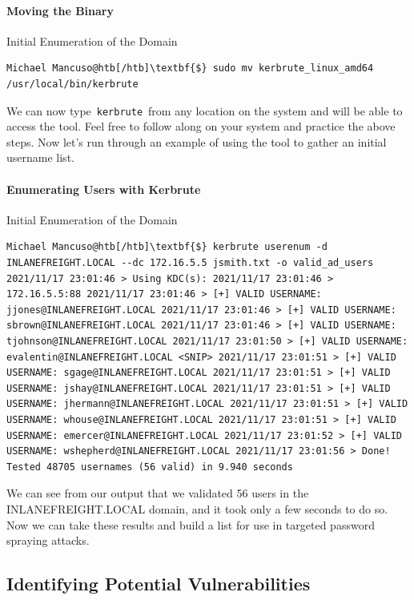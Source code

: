 \paragraph{Moving the Binary}

Initial Enumeration of the Domain

\begin{verbatim}
Michael Mancuso@htb[/htb]\textbf{$} sudo mv kerbrute_linux_amd64 /usr/local/bin/kerbrute 
\end{verbatim}

We can now type \verb|kerbrute| from any location on the system and will be able to access the tool. Feel free to follow along on your system and practice the above steps. Now let’s run through an example of using the tool to gather an initial username list.

\paragraph{Enumerating Users with Kerbrute}

Initial Enumeration of the Domain

\begin{verbatim}
Michael Mancuso@htb[/htb]\textbf{$} kerbrute userenum -d INLANEFREIGHT.LOCAL --dc 172.16.5.5 jsmith.txt -o valid_ad_users 2021/11/17 23:01:46 > Using KDC(s): 2021/11/17 23:01:46 > 172.16.5.5:88 2021/11/17 23:01:46 > [+] VALID USERNAME: jjones@INLANEFREIGHT.LOCAL 2021/11/17 23:01:46 > [+] VALID USERNAME: sbrown@INLANEFREIGHT.LOCAL 2021/11/17 23:01:46 > [+] VALID USERNAME: tjohnson@INLANEFREIGHT.LOCAL 2021/11/17 23:01:50 > [+] VALID USERNAME: evalentin@INLANEFREIGHT.LOCAL <SNIP> 2021/11/17 23:01:51 > [+] VALID USERNAME: sgage@INLANEFREIGHT.LOCAL 2021/11/17 23:01:51 > [+] VALID USERNAME: jshay@INLANEFREIGHT.LOCAL 2021/11/17 23:01:51 > [+] VALID USERNAME: jhermann@INLANEFREIGHT.LOCAL 2021/11/17 23:01:51 > [+] VALID USERNAME: whouse@INLANEFREIGHT.LOCAL 2021/11/17 23:01:51 > [+] VALID USERNAME: emercer@INLANEFREIGHT.LOCAL 2021/11/17 23:01:52 > [+] VALID USERNAME: wshepherd@INLANEFREIGHT.LOCAL 2021/11/17 23:01:56 > Done! Tested 48705 usernames (56 valid) in 9.940 seconds 
\end{verbatim}

We can see from our output that we validated 56 users in the INLANEFREIGHT.LOCAL domain, and it took only a few seconds to do so. Now we can take these results and build a list for use in targeted password spraying attacks.

\subsection{Identifying Potential Vulnerabilities}

